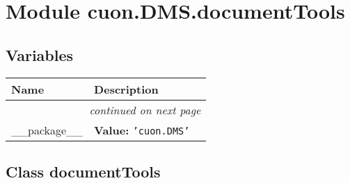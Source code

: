 %
%
%


\section{Module cuon.DMS.documentTools}

    \label{cuon:DMS:documentTools}


  \subsection{Variables}

    \vspace{-1cm}
\hspace{\varindent}\begin{longtable}{|p{\varnamewidth}|p{\vardescrwidth}|l}
\cline{1-2}
\cline{1-2} \centering \textbf{Name} & \centering \textbf{Description}& \\
\cline{1-2}
\endhead\cline{1-2}\multicolumn{3}{r}{\small\textit{continued on next page}}\\\endfoot\cline{1-2}
\endlastfoot\raggedright \_\-\_\-p\-a\-c\-k\-a\-g\-e\-\_\-\_\- & \raggedright \textbf{Value:} 
{\tt \texttt{'}\texttt{cuon.DMS}\texttt{'}}&\\
\cline{1-2}
\end{longtable}



\subsection{Class documentTools}

